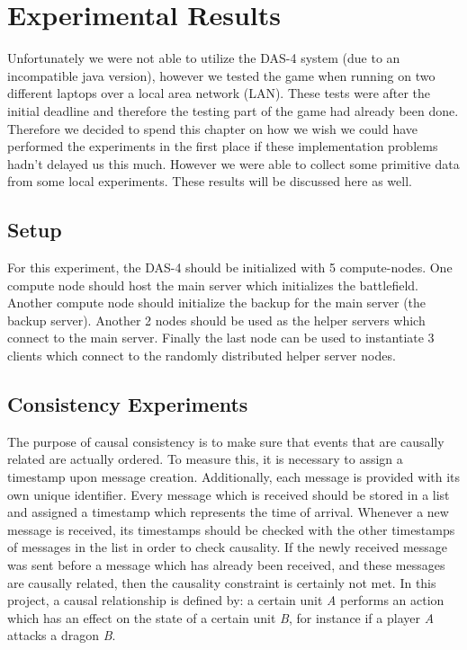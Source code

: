 \section{Experimental Results}
Unfortunately we were not able to utilize the DAS-4 system (due to an incompatible java version), however we tested the game when running on two different laptops over a local area network (LAN). These tests were after the initial deadline and therefore the testing part of the game had already been done. Therefore we decided to spend this chapter on how we wish we could have performed the experiments in the first place if these implementation problems hadn't delayed us this much. However we were able to collect some primitive data from some local experiments. These results will be discussed here as well.

\subsection{Setup}
For this experiment, the DAS-4 should be initialized with 5 compute-nodes. 
One compute node should host the main server which initializes the battlefield. 
Another compute node should initialize the backup for the main server (the backup server). 
Another 2 nodes should be used as the helper servers which connect to the main server. 
Finally the last node can be used to instantiate 3 clients which connect to the randomly distributed helper server nodes.

\subsection{Consistency Experiments}
The purpose of causal consistency is to make sure that events that are causally related are actually ordered. 
To measure this, it is necessary to assign a timestamp upon message creation. 
Additionally, each message is provided with its own unique identifier. 
Every message which is received should be stored in a list and assigned a timestamp which represents the time of arrival.
Whenever a new message is received, its timestamps should be checked with the other timestamps of messages in the list in order to check causality. If the newly received message was sent before a message which has already been received, and these messages are causally related, then the causality constraint is certainly not met.
In this project, a causal relationship is defined by: a certain unit \emph{A} performs an action which has an effect on the state of a certain unit \emph{B}, for instance if a player \emph{A} attacks a dragon \emph{B}.

